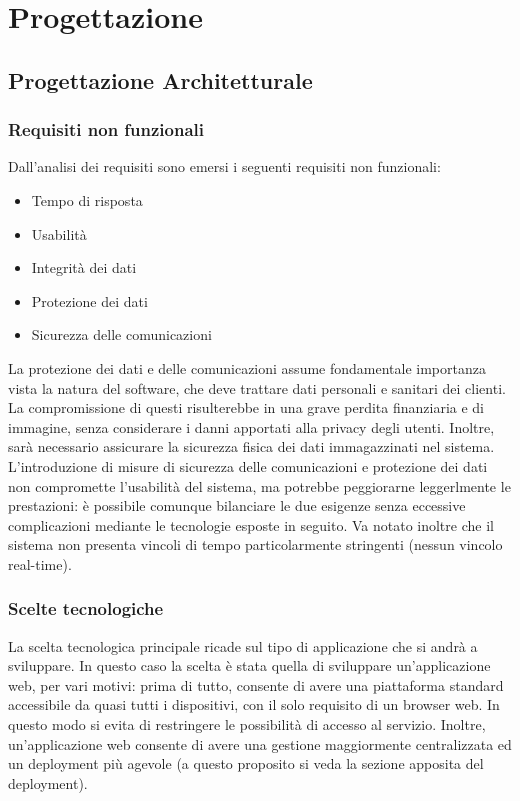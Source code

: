 \newpage
\section{Progettazione}

\subsection{Progettazione Architetturale}

\subsubsection{Requisiti non funzionali}

Dall'analisi dei requisiti sono emersi i seguenti requisiti non funzionali:
\begin{itemize}
\item Tempo di risposta
\item Usabilità
\item Integrità dei dati
\item Protezione dei dati 
\item Sicurezza delle comunicazioni
\end{itemize}
La protezione dei dati e delle comunicazioni assume fondamentale importanza vista la natura del software, 
che deve trattare dati personali e sanitari dei clienti. 
La compromissione di questi risulterebbe in una grave perdita finanziaria e di immagine, senza considerare i danni apportati alla privacy degli utenti. 
Inoltre, sarà necessario assicurare la sicurezza fisica dei dati immagazzinati nel sistema.
L'introduzione di misure di sicurezza delle comunicazioni e protezione dei dati non compromette l'usabilità del sistema, ma potrebbe peggiorarne leggerlmente le prestazioni: 
è possibile comunque bilanciare le due esigenze senza eccessive complicazioni mediante le tecnologie esposte in seguito. 
Va notato inoltre che il sistema non presenta vincoli di tempo particolarmente stringenti (nessun vincolo real-time).

\subsubsection{Scelte tecnologiche}

La scelta tecnologica principale ricade sul tipo di applicazione che si andrà a sviluppare.
In questo caso la scelta è stata quella di sviluppare un'applicazione web, per vari motivi:
prima di tutto, consente di avere una piattaforma standard accessibile da quasi tutti i dispositivi,
con il solo requisito di un browser web. In questo modo si evita di restringere le possibilità di accesso al servizio.
Inoltre, un'applicazione web consente di avere una gestione maggiormente centralizzata ed un deployment più agevole (a questo proposito si veda la sezione apposita del deployment).


